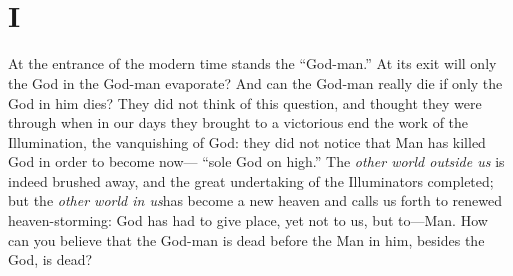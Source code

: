 
\chapter[Part Second: I]{\\
I}

\medskip{}

\noindent{}At the entrance of the modern time stands the ``God-man.'' At its 
exit will only the God in the God-man evaporate? And can the God-man really 
die if only the God in him dies? They did not think of this question, and 
thought they were through when in our days they brought to a victorious end 
the work of the Illumination, the vanquishing of God: they did not notice that 
Man has killed God in order to become now--- ``sole God on high.'' The 
\textit{other world outside us} is indeed brushed away, and the great 
undertaking of the Illuminators completed; but the \textit{other world in 
us}has become a new heaven and calls us forth to renewed heaven-storming: God 
has had to give place, yet not to us, but to---Man. How can you believe that 
the God-man is dead before the Man in him, besides the God, is dead?

\medskip{}
